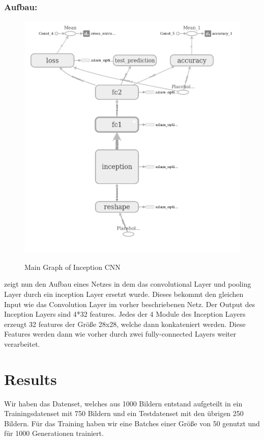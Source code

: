 \documentclass[runningheads,a4paper]{llncs}[2015/06/24]
\begin{document}
\subsubsection*{Aufbau:}
\begin{figure}
	\caption{Main Graph of Inception CNN}
	\includegraphics[width=\textwidth]{images/main_graph_inception.png}
	\label{fig:main_graph_inception}
\end{figure}
 zeigt nun den Aufbau eines Netzes in dem das convolutional Layer und pooling Layer durch ein inception Layer ersetzt wurde. Dieses bekommt den gleichen Input wie das Convolution Layer im vorher beschriebenen Netz. Der Output des Inception Layers sind 4*32 features. Jedes der 4 Module des Inception Layers erzeugt 32 features der Größe 28x28, welche dann konkateniert werden. Diese Features werden dann wie vorher durch zwei fully-connected Layers weiter verarbeitet.

\section{Results}\label{sec:result}
Wir haben das Datenset, welches aus 1000 Bildern entstand aufgeteilt in ein Trainingsdatenset mit 750 Bildern und ein Testdatenset mit den übrigen 250 Bildern. Für das Training haben wir eine Batches einer Größe von 50 genutzt und für 1000 Generationen trainiert. \\
\end{document}
